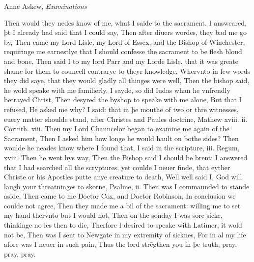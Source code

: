 \begin{texts}{Anne Askew, \emph{Examinations}}
\begin{textglossed}
    \internallinenumbers*{}
    Then would they nedes know of me, what I saide to the sacrament. I answeared, þt I already had said that I could say, Then after diuers wordes, they bad me go by, Then came my Lord Lisle, my Lord of Essex, and the Bishop of Winchester, requiringe me earnestlye that I should confesse the sacrament to be flesh bloud and bone, Then said I to my lord Parr and my Lorde Lisle, that it was greate shame for them to councell contrarye to theyr knowledge, Whervnto in few words they did saye, that they would gladly all thinges were well, Then the bishop said, he wold speake with me familierly, I sayde, so did Iudas whan he vnfrendly betrayed Christ, Then desyred the byshop to speake with me alone, But that I refused, He asked me why? I said: that in þe mouthe of two or thre witnesses, euery matter shoulde stand, after Christes and Paules doctrine, Mathew xviii. ii. Corinth. xiii. Then my Lord Chauncelor began to examine me again of the Sacrament, Then I asked him how longe he would hault on bothe sides? Then woulde he neades know where I found that, I said in the scripture, iii. Regum, xviii. Then he went hys way, Then the Bishop said I should be brent: I answered that I had searched all the scryptures, yet coulde I neuer finde, that eyther Christe or his Apostles putte anye creature to death, Well well said I, God will laugh your threatninges to skorne, Psalme, ii. Then was I commaunded to stande aside, Then came to me Doctor Cox, and Doctor Robinson, In conclusion we coulde not agree, Then they made me a bil of the sacrament: willing me to set my hand thervnto but I would not, Then on the sonday I was sore sicke, thinkinge no les then to die, Therfore I desired to speake with Latimer, it wold not be, Then was I sent to Newgate in my extremity of sicknes, For in al my life afore was I neuer in such pain, Thus the lord strēgthen you in þe truth, pray, pray, pray.
\end{textglossed}
\end{texts}

